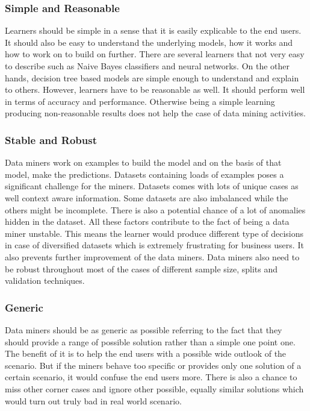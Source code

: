 \documentclass[sigplan]{acmart}\settopmatter{printfolios=true,printccs=false,printacmref=false}
\begin{document}
\subsubsection{Simple and Reasonable}

Learners should be simple in a sense that it is easily explicable to the end users. It should also be easy to understand the underlying models, how it works and how to work on to build on further. There are several learners that not very easy to describe such as Naive Bayes classifiers and neural networks. On the other hands, decision tree based models are simple enough to understand and explain to others. However, learners have to be reasonable as well. It should perform well in terms of accuracy and performance. Otherwise being a simple learning producing non-reasonable results does not help the case of data mining activities. 

\subsubsection{Stable and Robust}
Data miners work on examples to build the model and on the basis of that model, make the predictions. Datasets containing loads of examples poses a significant challenge for the miners. Datasets comes with lots of unique cases as well context aware information. Some datasets are also imbalanced while the others might be incomplete. There is also a potential chance of a lot of anomalies hidden in the dataset.  All these factors contribute to the fact of being a data miner unstable. This means the learner would produce different type of decisions in case of diversified datasets which is extremely frustrating for business users. It also prevents further improvement of the data miners. Data miners also need to be robust throughout most of the cases of different sample size, splits and validation techniques.  

\subsubsection{Generic}
Data miners should be as generic as possible referring to the fact that they should provide a range of possible solution rather than a simple one point one. The benefit of it is to help the end users with a possible wide outlook of the scenario. But if the miners behave too specific or provides only one solution of a certain scenario, it would confuse the end users more. There is also a chance to miss other corner cases and ignore other possible, equally similar solutions which would turn out truly bad in real world scenario.  
\end{document}

